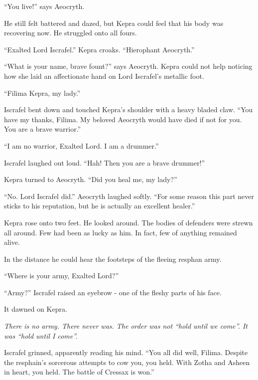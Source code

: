 \documentclass
  [a4paper,
   12pt,
   oneside
  ]%
  {article}
\begin{document}
``You live!'' says Aeocryth. 

He still felt battered and dazed, but Kepra could feel that his body was recovering now. 
He struggled onto all fours. 

``Exalted Lord Iscrafel.'' Kepra croaks. ``Hierophant Aeocryth.''

``What is your name, brave fount?'' says Aeocryth. Kepra could not help noticing how she laid an affectionate hand on Lord Iscrafel’s metallic foot.

``Filima Kepra, my lady.'' 

Iscrafel bent down and touched Kepra's shoulder with a heavy bladed claw. 
``You have my thanks, Filima. My beloved Aeocryth would have died if not for you. You are a brave warrior.'' 

``I am no warrior, Exalted Lord. I am a drummer.''

Iscrafel laughed out loud. ``Hah! Then you are a brave drummer!'' 

Kepra turned to Aeocryth. ``Did you heal me, my lady?''

``No. Lord Iscrafel did.'' Aeocryth laughed softly. 
``For some reason this part never sticks to his reputation, but he is actually an excellent healer.''

Kepra rose onto two feet. He looked around. 
The bodies of defenders were strewn all around. 
Few had been as lucky as him. 
In fact, few of anything remained alive. 

In the distance he could hear the footsteps of the fleeing resphan army. 

``Where is your army, Exalted Lord?''

``Army?'' Iscrafel raised an eyebrow - one of the fleshy parts of his face.

It dawned on Kepra. 

\emph{There is no army. There never was. The order was not ``hold until we come''. It was ``hold until I come''.}

Iscrafel grinned, apparently reading his mind. ``You all did well, Filima. Despite the resphain's sorcerous attempts to cow you, you held. With Zotha and Asheen in heart, you held. The battle of Cressax is won.''
\end{document}

